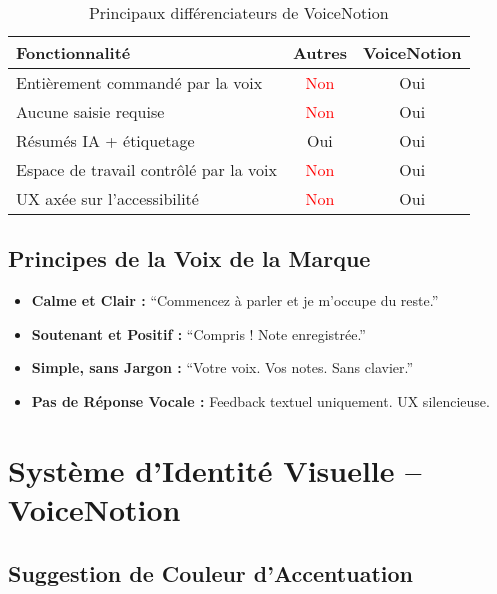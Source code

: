 \begin{table}[H]
    \centering
    \begin{tabular}{|p{5cm}|c|c|}
        \hline
        \textbf{Fonctionnalité} & \textbf{Autres} & \textbf{VoiceNotion} \\
        \hline
        Entièrement commandé par la voix & \textcolor{red}{Non} & \textcolor{green!60!black}{Oui} \\
        \hline
        Aucune saisie requise & \textcolor{red}{Non} & \textcolor{green!60!black}{Oui} \\
        \hline
        Résumés IA + étiquetage & \textcolor{green!60!black}{Oui} & \textcolor{green!60!black}{Oui} \\
        \hline
        Espace de travail contrôlé par la voix & \textcolor{red}{Non} & \textcolor{green!60!black}{Oui} \\
        \hline
        UX axée sur l'accessibilité & \textcolor{red}{Non} & \textcolor{green!60!black}{Oui} \\
        \hline
    \end{tabular}
    \caption{Principaux différenciateurs de VoiceNotion}
    \label{tab:key_differentiators}
\end{table}

\subsection{Principes de la Voix de la Marque}

\begin{itemize}
    \item \textbf{Calme et Clair :} “Commencez à parler et je m'occupe du reste.”
    \item \textbf{Soutenant et Positif :} “Compris ! Note enregistrée.”
    \item \textbf{Simple, sans Jargon :} “Votre voix. Vos notes. Sans clavier.”
    \item \textbf{Pas de Réponse Vocale :} Feedback textuel uniquement. UX silencieuse.
\end{itemize}

\section{Système d'Identité Visuelle – VoiceNotion}

\subsection{Suggestion de Couleur d'Accentuation}

